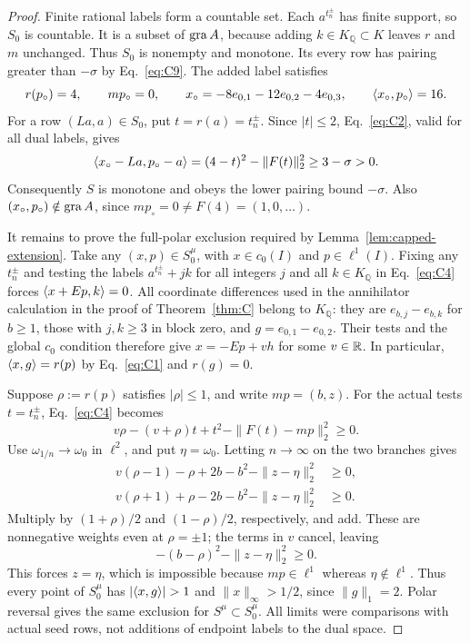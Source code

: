\begin{proof}
Finite rational labels form a countable set. Each $a^{t_n^\pm}$ has
finite support, so $S_0$ is countable. It is a subset of $\operatorname{gra} A$,
because adding $k\in K_{\mathbb Q}\subset K$ leaves $r$ and $m$
unchanged. Thus $S_0$ is nonempty and monotone. Its every row has
pairing greater than $-\sigma$ by Eq.~\eqref{eq:C9}.
The added label satisfies
\[
r(p_\circ)=4,\qquad mp_\circ=0,\qquad
x_\circ=-8e_{0,1}-12e_{0,2}-4e_{0,3},\qquad
\langle x_\circ,p_\circ\rangle=16.
\]
For a row $(La,a)\in S_0$, put $t=r(a)=t_n^\pm$. Since $|t|\le2$,
Eq.~\eqref{eq:C2}, valid for all dual labels, gives
\[
\langle x_\circ-La,p_\circ-a\rangle
=(4-t)^2-\|F(t)\|_2^2\ge3-\sigma>0.
\]
Consequently $S$ is monotone and obeys the lower pairing bound
$-\sigma$. Also $(x_\circ,p_\circ)\notin\operatorname{gra} A$, since
$mp_\circ=0\ne F(4)=(1,0,\ldots)$.

It remains to prove the full-polar exclusion required by
Lemma~\ref{lem:capped-extension}. Take any
$(x,p)\in S_0^\mu$, with $x\in c_0(I)$ and $p\in\ell^1(I)$.
Fixing any $t_n^\pm$ and testing the labels
$a^{t_n^\pm}+j k$ for all integers $j$ and all $k\in K_{\mathbb Q}$
in Eq.~\eqref{eq:C4} forces $\langle x+Ep,k\rangle=0$.
All coordinate differences used in the annihilator calculation in the
proof of Theorem~\ref{thm:C} belong to $K_{\mathbb Q}$: they are
$e_{b,j}-e_{b,k}$ for $b\ge1$, those with $j,k\ge3$ in block zero,
and $g=e_{0,1}-e_{0,2}$. Their tests and the global $c_0$ condition
therefore give $x=-Ep+v h$ for some $v\in\mathbb R$.
In particular, $\langle x,g\rangle=r(p)$ by Eq.~\eqref{eq:C1} and $r(g)=0$.

Suppose $\rho:=r(p)$ satisfies $|\rho|\le1$, and write $mp=(b,z)$.
For the actual tests $t=t_n^\pm$, Eq.~\eqref{eq:C4} becomes
\[
v\rho-(v+\rho)t+t^2-\|F(t)-mp\|_2^2\ge0.
\]
Use $\omega_{1/n}\to\omega_0$ in $\ell^2$, and put
$\eta=\omega_0$. Letting $n\to\infty$ on the two branches gives
\begin{align*}
v(\rho-1)-\rho+2b-b^2-\|z-\eta\|_2^2&\ge0,\\
v(\rho+1)+\rho-2b-b^2-\|z-\eta\|_2^2&\ge0.
\end{align*}
Multiply by $(1+\rho)/2$ and $(1-\rho)/2$, respectively, and add.
These are nonnegative weights even at $\rho=\pm1$; the terms in $v$
cancel, leaving
\[
-(b-\rho)^2-\|z-\eta\|_2^2\ge0.
\]
This forces $z=\eta$, which is impossible because $mp\in\ell^1$
whereas $\eta\notin\ell^1$. Thus every point of $S_0^\mu$ has
$|\pair{x}{g}|>1$ and $\|x\|_\infty>1/2$, since $\|g\|_1=2$.
Polar reversal gives the same exclusion for $S^\mu\subset S_0^\mu$.
All limits were comparisons with actual seed rows, not additions of
endpoint labels to the dual space.


\end{proof}
